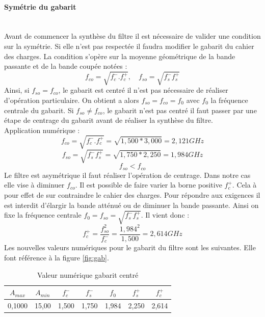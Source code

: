 \documentclass[french]{article}
\begin{document}
\paragraph{Symétrie du gabarit} ~~\\ \noindent
Avant de commencer la synthèse du filtre il est nécessaire de valider une condition sur la symétrie. Si elle n'est pas respectée il faudra modifier le gabarit du cahier des charges. La condition s'opère sur la moyenne géométrique de la bande passante et de la bande coupée notées :
\begin{equation}
	 f_{co} = \sqrt{f_c^-.f_c^+}, \quad f_{so} = \sqrt{f_s^- f_s^+}
\end{equation}
Ainsi, si $f_{so} = f_{co}$, le gabarit est centré il n'est pas nécessaire de réaliser d'opération particulaire. On obtient a alors  $f_{so} = f_{co} = f_0$ avec $f_0$ la fréquence centrale du gabarit. Si $f_{so} \neq f_{co}$, le gabarit n'est pas centré il faut passer par une étape de centrage du gabarit avant de réaliser la synthèse du filtre.\\
Application numérique :\\
\begin{equation}
f_{co} = \sqrt{f_c^-.f_c^+} = \sqrt{1,500*3,000} = 2,121 GHz
\end{equation}
\begin{equation}
	f_{so} = \sqrt{f_s^- f_s^+} = \sqrt{1,750*2,250} = 1,984 GHz
\end{equation}
\begin{equation}
f_{so} <	f_{co}
\end{equation}
Le filtre est asymétrique il faut réaliser l'opération de centrage. Dans notre cas elle vise à diminuer $f_{co}$. Il est possible de faire varier la borne positive $f_c^+$. Cela à pour effet de sur contraindre le cahier des charges. Pour répondre aux exigences il est interdit d'élargir la bande atténué ou de diminuer la bande passante. Ainsi on fixe la fréquence centrale $f_0 = f_{so} = \sqrt{f_s^- f_s^+}$.  
Il vient donc :
\begin{equation}
f_c^+=\frac{f_{so}^2}{f_c^-}=\frac{1,984^2}{1,500}=2,614GHz
\end{equation}
Les nouvelles valeurs numériques pour le gabarit du filtre sont les suivantes. Elle font référence à la figure \ref{fig:gab}.
	\begin{table}[H]
	\centering
	\begin{tabular}{|c|c|c|c|c|c|c|}
		\hline
		$A_{max}$& $A_{min}$ & $f_c^-$ & $f_s^-$ & $f_0$ & $f_s^+$ &$f_c^+$ \\ \hline
		0,1000		 & 15,00 		& 1,500	   & 1,750 & 1,984 & 2,250& 2,614 \\ \hline
	\end{tabular}
	\caption{Valeur numérique gabarit centré}
\end{table}
\end{document}
